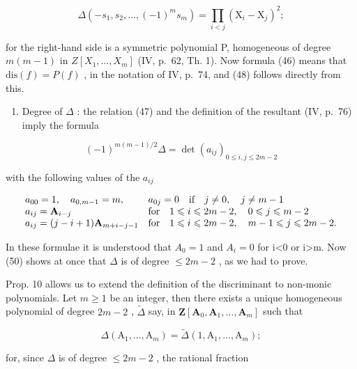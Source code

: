 \[
\Delta \left(- s _ {1}, s _ {2}, \dots , (- 1) ^ {m} s _ {m}\right) = \prod_ {i <   j} \left(\mathrm{X} _ {i} - \mathrm{X} _ {j}\right) ^ {2};\tag{49}
\]

for the right-hand side is a symmetric polynomial P, homogeneous of degree \(m(m-1)\) in \(Z[X_{1},\ldots,X_{m}]\) (IV, p.~62, Th. 1). Now formula (46) means that \(\text{dis}(f)=P(f)\) , in the notation of IV, p.~74, and (48) follows directly from this.

\begin{enumerate}
\def\labelenumi{\alph{enumi})}
\setcounter{enumi}{2}
\tightlist
\item
  Degree of \(\Delta\) : the relation (47) and the definition of the resultant (IV, p.~76) imply the formula
\end{enumerate}

\[
(- 1) ^ {m (m - 1) / 2} \Delta = \det \left(a _ {i j}\right) _ {0 \leqslant i, j \leqslant 2 m - 2}\tag{50}
\]

with the following values of the \(a_{ij}\)

\[
\begin{array}{l l} a _ {0 0} = 1, \quad a _ {0, m - 1} = m, & a _ {0 j} = 0 \quad \text {if} \quad j \neq 0, \quad j \neq m - 1 \\ a _ {i j} = \mathbf {A} _ {i - j} & \text {for} \quad 1 \leqslant i \leqslant 2 m - 2, \quad 0 \leqslant j \leqslant m - 2 \\ a _ {i j} = (j - i + 1) \mathbf {A} _ {m + i - j - 1} & \text {for} \quad 1 \leqslant i \leqslant 2 m - 2, \quad m - 1 \leqslant j \leqslant 2 m - 2. \end{array}
\]

In these formulae it is understood that \(A_{0}=1\) and \(A_{i}=0\) for i\textless0 or i\textgreater m. Now (50) shows at once that \(\Delta\) is of degree \(\leqslant2m-2\) , as we had to prove.

Prop. 10 allows us to extend the definition of the discriminant to non-monic polynomials. Let \(m \geqslant 1\) be an integer, then there exists a unique homogeneous polynomial of degree \(2m - 2\) , \(\tilde{\Delta}\) say, in \(\mathbf{Z}[\mathbf{A}_0, \mathbf{A}_1, \ldots, \mathbf{A}_m]\) such that

\[
\Delta \left(\mathrm{A} _ {1}, \dots , \mathrm{A} _ {m}\right) = \tilde {\Delta} \left(1, \mathrm{A} _ {1}, \dots , \mathrm{A} _ {m}\right);\tag{51}
\]

for, since \(\Delta\) is of degree \(\leqslant 2m - 2\) , the rational fraction

